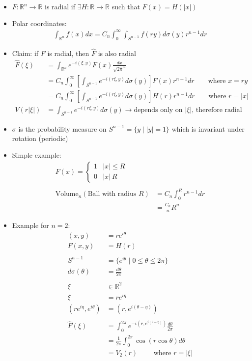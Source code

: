 \documentclass[12pt, a4paper]{article}
\begin{document}
\begin{itemize}
    \item $F:\mathbb{R}^n \rightarrow \mathbb{R}$ is radial if $\exists H:\mathbb{R} \rightarrow \mathbb{R}$ such that $F(x) = H(|x|)$
    \item Polar coordinates:
    \begin{align*}
        \int_{\mathbb{R}^n}f(x)dx = C_n\int_0^\infty\int_{S^{n-1}}f(ry)d\sigma(y)r^{n-1}dr
    \end{align*}
    \item Claim: if $F$ is radial, then $\hat{F}$ is also radial
    \begin{align*}
        \hat{F}(\xi)&=\int_{\mathbb{R}^n}e^{-i(\xi, y)}F(x)\frac{dx}{\sqrt{2\pi}^n}\\
        &=C_n\int_0^\infty\left[\int_{S^{n-1}}e^{-i(r\xi, y)}d\sigma(y)\right]F(x)r^{n-1}dr \qquad \text{where }x=ry\\
        &=C_n\int_0^\infty\left[\int_{S^{n-1}}e^{-i(r\xi, y)}d\sigma(y)\right]H(r)r^{n-1}dr \qquad \text{where }r=|x|\\
        V(r|\xi|)&=\int_{S^{n-1}}e^{-i(r\xi, y)}d\sigma(y) \rightarrow \text{depends only on $|\xi|$, therefore radial}
    \end{align*}
    \item $\sigma$ is the probability measure on $S^{n-1} = \{y\;|\;|y|=1\}$ which is invariant under rotation (periodic)\\
    \item Simple example:
    \begin{align*}
        F(x) = \begin{cases}
            1&|x|\leq R\\
            0&|x|\>R
        \end{cases}\\\\
        \text{Volume}_n(\text{Ball with radius $R$}) &=C_n\int_0^Rr^{n-1}dr\\
        &=\frac{C_n}{n}R^n 
    \end{align*}
    \item Example for $n=2$:
    \begin{align*}
        (x, y)&= re^{i\theta}\\
        F(x, y) &= H(r)\\\\
        S^{n-1} &= \{e^{i\theta}\;|\; 0 \leq \theta \leq 2\pi\}\\
        d\sigma(\theta)&=\frac{d\theta}{2\pi}\\\\
        \xi&\in\mathbb{R}^2\\
        \xi&=re^{i\eta}\\
        (re^{i\eta}, e^{i\theta}) &= (r, e^{i(\theta-\eta)})\\\\
        \hat{F}(\xi)&=\int_0^{2\pi}e^{-i(r, e^{i(\theta-\eta)})}\frac{d\theta}{2\pi}\\
        &=\frac{1}{2\pi}\int_0^{2\pi}\cos(r\cos\theta)d\theta\\
        &=V_2(r) \qquad \text{ where }r=|\xi|
    \end{align*}
\end{itemize}
\end{document}
